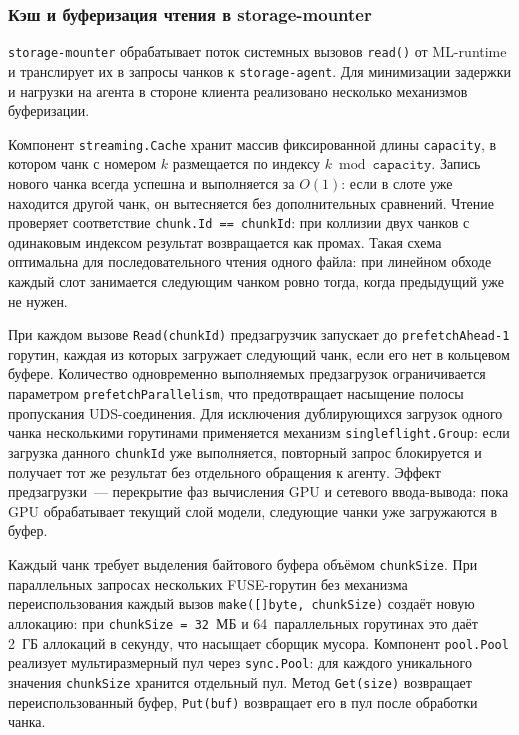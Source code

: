 \subsubsection{Кэш и буферизация чтения в storage-mounter}

\texttt{storage-mounter} обрабатывает поток системных вызовов \texttt{read()} от ML-runtime и транслирует их в запросы чанков к \texttt{storage-agent}. Для минимизации задержки и нагрузки на агента в стороне клиента реализовано несколько механизмов буферизации.

 Компонент \texttt{streaming.Cache} хранит массив фиксированной длины \texttt{capacity}, в котором чанк с номером $k$ размещается по индексу $k \bmod \mathtt{capacity}$. Запись нового чанка всегда успешна и выполняется за $O(1)$: если в слоте уже находится другой чанк, он вытесняется без дополнительных сравнений. Чтение проверяет соответствие \texttt{chunk.Id == chunkId}: при коллизии двух чанков с одинаковым индексом результат возвращается как промах. Такая схема оптимальна для последовательного чтения одного файла: при линейном обходе каждый слот занимается следующим чанком ровно тогда, когда предыдущий уже не нужен.

 При каждом вызове \texttt{Read(chunkId)} предзагрузчик запускает до \texttt{prefetchAhead-1} горутин, каждая из которых загружает следующий чанк, если его нет в кольцевом буфере. Количество одновременно выполняемых предзагрузок ограничивается параметром \texttt{prefetchParallelism}, что предотвращает насыщение полосы пропускания UDS-соединения. Для исключения дублирующихся загрузок одного чанка несколькими горутинами применяется механизм \texttt{singleflight.Group}: если загрузка данного \texttt{chunkId} уже выполняется, повторный запрос блокируется и получает тот же результат без отдельного обращения к агенту. Эффект предзагрузки~--- перекрытие фаз вычисления GPU и сетевого ввода-вывода: пока GPU обрабатывает текущий слой модели, следующие чанки уже загружаются в буфер.

 Каждый чанк требует выделения байтового буфера объёмом \texttt{chunkSize}. При параллельных запросах нескольких FUSE-горутин без механизма переиспользования каждый вызов \texttt{make([]byte, chunkSize)} создаёт новую аллокацию: при \texttt{chunkSize = 32}~МБ и 64~параллельных горутинах это даёт 2~ГБ аллокаций в секунду, что насыщает сборщик мусора. Компонент \texttt{pool.Pool} реализует мультиразмерный пул через \texttt{sync.Pool}: для каждого уникального значения \texttt{chunkSize} хранится отдельный пул. Метод \texttt{Get(size)} возвращает переиспользованный буфер, \texttt{Put(buf)} возвращает его в пул после обработки чанка.

